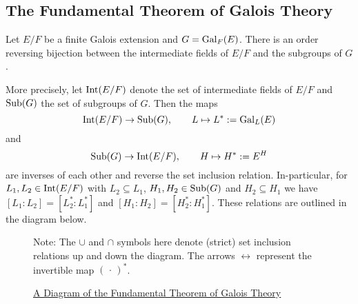 \documentclass[11pt]{article}
\begin{document}
\subsection{The Fundamental Theorem of Galois Theory}

\begin{theorem}
    Let $E/F$ be a finite Galois extension and $G=\operatorname{Gal}_F(E)$. There is an order reversing bijection between the intermediate fields of $E/F$ and the subgroups of $G$.

    More precisely, let $\operatorname{Int}(E/F)$ denote the set of intermediate fields of $E/F$ and $\operatorname{Sub}(G)$ the set of subgroups of $G$. Then the maps
    \[\operatorname{Int}(E/F)\to\operatorname{Sub}(G),\qquad L\mapsto L^*:=\operatorname{Gal}_L(E)\]
    and
    \[\operatorname{Sub}(G)\to\operatorname{Int}(E/F),\qquad H\mapsto H^*:=E^H\]
    are inverses of each other and reverse the set inclusion relation. In-particular, for $L_1,L_2\in\operatorname{Int}(E/F)$ with $L_2\subseteq L_1$, $H_1,H_2\in\operatorname{Sub}(G)$ and $H_2\subseteq H_1$ we have $[L_1:L_2]=[L_2^*:L_1^*]$ and $[H_1:H_2]=[H_2^*:H_1^*]$. These relations are outlined in the diagram below.
\end{theorem}

\begin{figure}
    \centering
    \caption{\ul{A Diagram of the Fundamental Theorem of Galois Theory}}
    
    \vspace{10pt}
    \vspace{10pt}
    \begin{centeremph}[110pt]
        Note: The $\cup$ and $\cap$ symbols here denote (strict) set inclusion relations up and down the diagram. The arrows $\leftrightarrow$ represent the invertible map $(\,\cdot\,)^*$.
    \end{centeremph}
\end{figure}
\end{document}
